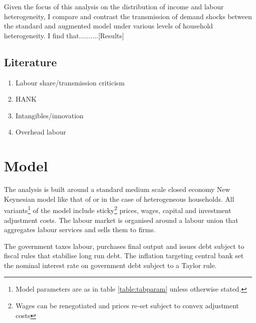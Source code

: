\documentclass[12pt]{article}
\begin{document}
Given the focus of this analysis on the distribution of income and labour heterogeneity, I compare and contrast the transmission of demand shocks between the standard and augmented model under various levels of household heterogeneity. I find that..........[Results]

\subsection{Literature}

\begin{enumerate}
\item Labour share/transmission criticism
\item HANK
\item Intangibles/innovation
\item Overhead labour

\end{enumerate}



\section{Model}

The analysis is built around a standard medium scale closed economy New Keynesian model like that of \cite{smets2007shocks} or \cite{bayer2020shocks} in the case of heterogeneous households. All variants\footnote{Model parameters are as in table \ref{table:tabparam} unless otherwise stated.} of the model include sticky\footnote{Wages can be renegotiated and prices re-set subject to convex adjustment costs
} prices, wages, capital and investment adjustment costs. The labour market is organised around a labour union that aggregates labour services and sells them to firms. 

The government taxes labour, purchases final output and issues debt subject to fiscal rules that stabilise long run debt. The inflation targeting central bank set the nominal interest rate on government debt subject to a Taylor rule. 
\end{document}

